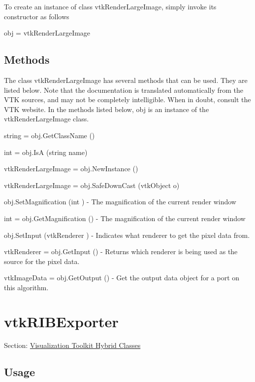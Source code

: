 To create an instance of class vtk\-Render\-Large\-Image, simply invoke its constructor as follows \begin{DoxyVerb}  obj = vtkRenderLargeImage
\end{DoxyVerb}
 \hypertarget{vtkwidgets_vtkxyplotwidget_Methods}{}\subsection{Methods}\label{vtkwidgets_vtkxyplotwidget_Methods}
The class vtk\-Render\-Large\-Image has several methods that can be used. They are listed below. Note that the documentation is translated automatically from the V\-T\-K sources, and may not be completely intelligible. When in doubt, consult the V\-T\-K website. In the methods listed below, {\ttfamily obj} is an instance of the vtk\-Render\-Large\-Image class. 
\begin{DoxyItemize}
\item {\ttfamily string = obj.\-Get\-Class\-Name ()}  
\item {\ttfamily int = obj.\-Is\-A (string name)}  
\item {\ttfamily vtk\-Render\-Large\-Image = obj.\-New\-Instance ()}  
\item {\ttfamily vtk\-Render\-Large\-Image = obj.\-Safe\-Down\-Cast (vtk\-Object o)}  
\item {\ttfamily obj.\-Set\-Magnification (int )} -\/ The magnification of the current render window  
\item {\ttfamily int = obj.\-Get\-Magnification ()} -\/ The magnification of the current render window  
\item {\ttfamily obj.\-Set\-Input (vtk\-Renderer )} -\/ Indicates what renderer to get the pixel data from.  
\item {\ttfamily vtk\-Renderer = obj.\-Get\-Input ()} -\/ Returns which renderer is being used as the source for the pixel data.  
\item {\ttfamily vtk\-Image\-Data = obj.\-Get\-Output ()} -\/ Get the output data object for a port on this algorithm.  
\end{DoxyItemize}\hypertarget{vtkhybrid_vtkribexporter}{}\section{vtk\-R\-I\-B\-Exporter}\label{vtkhybrid_vtkribexporter}
Section\-: \hyperlink{sec_vtkhybrid}{Visualization Toolkit Hybrid Classes} \hypertarget{vtkwidgets_vtkxyplotwidget_Usage}{}\subsection{Usage}\label{vtkwidgets_vtkxyplotwidget_Usage}
